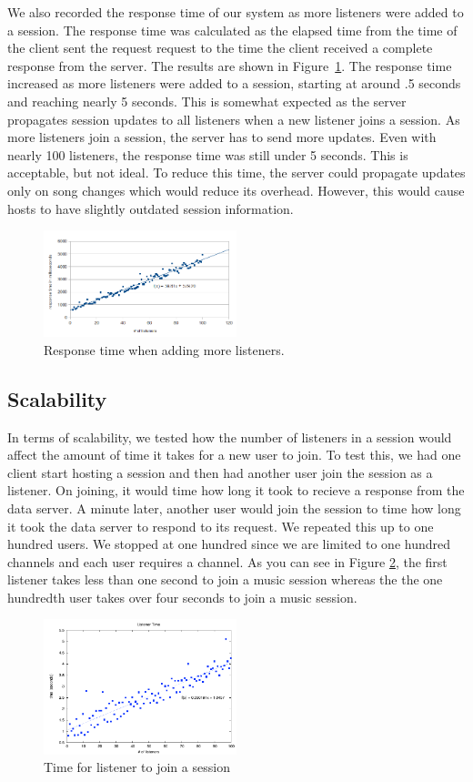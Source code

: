 We also recorded the response time of our system as more listeners
were added to a session. The response time was calculated as the
elapsed time from the time of the client sent the request request
to the time the client
received a complete response from the server. The results are shown in
Figure~\ref{fig:addListenersResponseTime}. The response time
increased as more listeners were added to a session, starting at
around .5 seconds and reaching nearly 5 seconds. This is somewhat
expected as the server propagates session updates to all listeners
when a new listener joins a session. As more listeners join a
session, the server has to send more updates. Even with nearly
100 listeners, the response time was still under 5 seconds. This
is acceptable, but not ideal. To reduce this time, the server
could propagate updates only on song changes which would reduce
its overhead. However, this would cause hosts to have slightly
outdated session information.

\begin{figure}[h]
	\centering
	\includegraphics[width=0.5\textwidth]{add_listeners_response_time.png}
	\caption{Response time when adding more listeners.}
	\label{fig:addListenersResponseTime}
\end{figure}

\subsection{Scalability}
In terms of scalability, we tested how   
the number of listeners in a session 
would affect the amount of time it takes 
for a new user to join. 
To test this, we had one client start hosting a session and then had 
another user join the session as a listener. On joining, it would time 
how long it took to recieve a response from the data server. 
A minute later, another user would 
join the session to time how long it took the data server to respond to its request. 
We repeated this up to one hundred 
users. We stopped at one hundred  since we are limited to one hundred channels
and each user requires a channel. As you can see in Figure \ref{fig:addListenersJoinTime}, 
the first listener takes less than one second to join a music session 
whereas the the one hundredth user takes over four seconds to join a music session.  

\begin{figure}[h]
	\centering
	\includegraphics[width=0.5\textwidth]{deployed_time5.pdf}
	\caption{Time for listener to join a session}
	\label{fig:addListenersJoinTime}
\end{figure}
